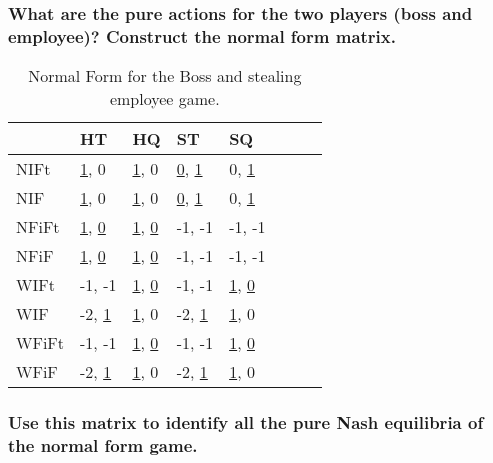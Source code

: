 \subsubsection{What are the pure actions for the two players (boss and employee)? Construct the normal
form matrix.}


\begin{table}[H]
  \centering
  \begin{tabular}{|l|l|l|l|l|l|l|l|}
    \hline
    & HT                                    & HQ                            & ST   & SQ   \\ \hline
    NIFt  & \underline{1}, 0                & \underline{1}, 0              & \underline{0}, \underline{1}   & 0, \underline{1}             \\ \hline
    NIF   & \underline{1}, 0                & \underline{1}, 0              & \underline{0}, \underline{1}   & 0, \underline{1}             \\ \hline
    NFiFt & \underline{1}, \underline{0}    & \underline{1}, \underline{0}  & -1, -1                         & -1, -1                       \\ \hline
    NFiF  & \underline{1}, \underline{0}    & \underline{1}, \underline{0}  & -1, -1                         & -1, -1                       \\ \hline
    WIFt  & -1, -1                          & \underline{1}, \underline{0}  & -1, -1                         & \underline{1}, \underline{0} \\ \hline
    WIF   & -2, \underline{1}               & \underline{1}, 0              & -2, \underline{1}              & \underline{1}, 0             \\ \hline
    WFiFt & -1, -1                          & \underline{1}, \underline{0}  & -1, -1                         & \underline{1}, \underline{0} \\ \hline
    WFiF  & -2, \underline{1}               & \underline{1}, 0              & -2, \underline{1}              & \underline{1}, 0             \\ \hline


  \end{tabular}
  \caption{Normal Form for the Boss and stealing employee game.}
  \label{lt2}
\end{table}


\subsubsection{Use this matrix to identify all the pure Nash equilibria of the normal form game.}

